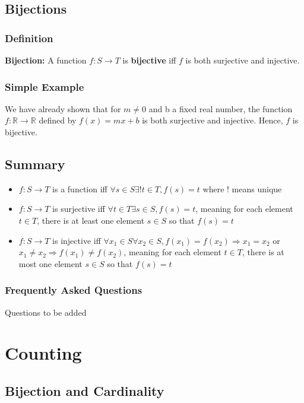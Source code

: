 \documentclass[12pt]{report}
\begin{document}
	\section{Bijections}
		\subsection{Definition}
			\textbf{Bijection:} A function $f:S \rightarrow T$ is \textbf{bijective} iff $f$ is both surjective and injective.
		\subsection{Simple Example}
			We have already shown that for $m \neq 0$ and b a fixed real number, the function $f:\mathbb{R} \rightarrow \mathbb{R}$ defined by $f(x) = mx + b$ is both surjective and injective. Hence, $f$ is bijective.

	\section{Summary}
		\begin{itemize}
			\item $f:S \rightarrow T$ is a function iff $\forall s \in S \exists !t \in T, f(s) = t$ where ! means unique
			\item $f:S \rightarrow T$ is surjective iff $\forall t \in T \exists s \in S, f(s) = t$, meaning for each element $t \in T$, there is at least one element $s \in S$ so that $f(s) = t$			

			\item $f:S \rightarrow T$ is injective iff $\forall x_1 \in S \forall x_2 \in S, f(x_1) = f(x_2) \Rightarrow x_1 = x_2$ or $x_1 \neq x_2 \Rightarrow f(x_1) \neq f(x_2)$, meaning for each element $t \in T$, there is at most one element $s \in S$ so that $f(s) = t$			
		\end{itemize}
		\subsection{Frequently Asked Questions}
			Questions to be added
\chapter{Counting}
	\section{Bijection and Cardinality}
\end{document}
